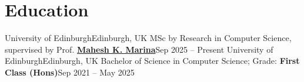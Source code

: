 \section{Education}
  \resumeSubHeadingListStart
    \resumeSubheading
      {University of Edinburgh}{Edinburgh, UK}
      {MSc by Research in Computer Science, supervised by Prof. \href{https://homepages.inf.ed.ac.uk/mmarina/}{\textbf{Mahesh K. Marina}}}{Sep 2025 -- Present}
    \resumeSubheading
      {University of Edinburgh}{Edinburgh, UK}
      {Bachelor of Science in Computer Science; Grade: \textbf{First Class (Hons)}}{Sep 2021 -- May 2025}
  \resumeSubHeadingListEnd